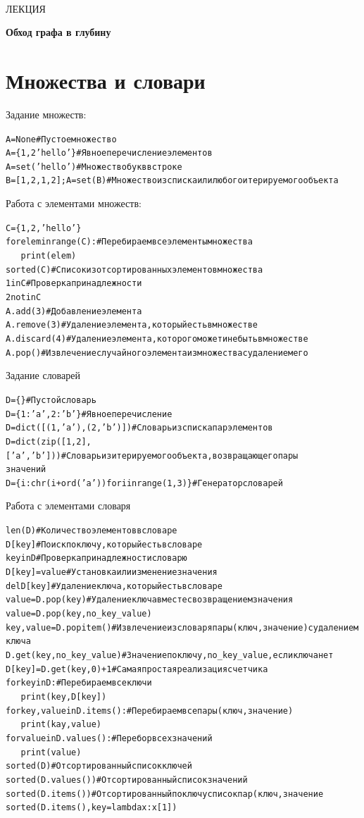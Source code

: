 \documentclass[a4paper,12pt]{article}
\theoremstyle{plain} %
\theoremstyle{definition} %
\theoremstyle{remark} %
\newcounter{infa}[section]
\newcounter{num}
\newcommand{\tab}{\ \ \ }
\newcommand{\com}[1]{{\color{grey}\# #1}}
\newcommand{\ini}{{\color{infa}in}}
\newcommand{\rangei}{{\color{infa}range}}
\newcommand{\fori}{{\color{infa}for}}
\newcommand{\printi}{{\color{infa1}print}}
\newcommand{\seti}{{\color{infa}set}}
\newcommand{\noti}{{\color{infa}not}}
\newcommand{\dicti}{{\color{infa}dict}}
\newcommand{\zipi}{{\color{infa}zip}}
\newcommand{\chri}{{\color{infa}chr}}
\newcommand{\ordi}{{\color{infa}ord}}
\newcommand{\leni}{{\color{infa}len}}
\newcommand{\deli}{{\color{infa}del}}
\newcommand{\sortedi}{{\color{infa}sorted}}
\newcommand{\keyi}{{\color{infa}key}}
\newcommand{\lambdai}{{\color{infa}lambda}}
\newenvironment{infanoname}{
	
	\begin{alltt}%
	}{\end{alltt}
	\setcounter{num}{0}
	\vspace{0.1cm}}
\begin{document}
\newcommand{\lec}[1]{\addtocounter{lec}{1} \setcounter{section}{0}%
\begin{center}
{\LARGE ЛЕКЦИЯ %
\vspace{2mm}%

\textbf{#1}%
}
\end{center}
}
\newpage
\
\setcounter{lec}{2}
\lec{Обход графа в глубину}
\section{Множества и словари}
\noindent Задание множеств:
\begin{infanoname}
A = None \com{Пустое множество}
A = \{1, 2 'hello'\} \com{Явное перечисление элементов}
A = \seti('hello') \com{Множество букв в строке}
B = [1, 2, 1, 2]; A = \seti(B) \com{Множество из списка или любого итерируемого объекта}
\end{infanoname}
Работа с элементами множеств:
\begin{infanoname}
C = \{1, 2, 'hello'\}
\fori elem \ini \rangei(C): \com{Перебираем все элементы множества}
\tab \printi(elem)
sorted(C) \com{Список из отсортированных элементов множества}
1 \ini C \com{Проверка принадлежности}
2 \noti \ini C
A.add(3) \com{Добавление элемента}
A.remove(3) \com{Удаление элемента, который есть в множестве}
A.discard(4) \com{Удаление элемента, которого может и не быть в множестве}
A.pop() \com{Извлечение случайного элемента из множества с удалением его}
\end{infanoname}
Задание словарей
\begin{infanoname}
D = \{\} \com{Пустой словарь}
D = \{1: 'a', 2: 'b'\} \com{Явное перечисление}
D = \dicti([(1, 'a'), (2, 'b')]) \com{Словарь из списка пар элементов}
D = \dicti(\zipi([1, 2], ['a', 'b'])) \com{Словарь из итерируемого объекта, возвращающего пары\\ значений}
D = \{i: \chri(i + \ordi('a')) \fori i \ini \rangei(1, 3)\} \com{Генератор словарей}
\end{infanoname}
Работа с элементами словаря
\begin{infanoname}
\leni(D) \com{Количество элементов в словаре}
D[key] \com{Поиск по ключу, который есть в словаре}
key in D \com{Проверка принадлежности словарю}
D[key] = value \com{Установка или изменение значения}
\deli D[key] \com{Удаление ключа, который есть в словаре}
value = D.pop(key) \com{Удаление ключа вместе с возвращением значения}
value = D.pop(key, no_key_value)
key, value = D.popitem() \com{Извлечение из словаря пары (ключ, значение) с удалением ключа}
D.get(key, no_key_value) \com{Значение по ключу, no_key_value, если ключа нет}
D[key] = D.get(key, 0) + 1 \com{Самая простая реализация счетчика}
\fori key \ini D: \com{Перебираем все ключи}
\tab \printi(key, D[key])
\fori key, value \ini D.items(): \com{Перебираем все пары (ключ, значение)}
\tab \printi(kay, value)
\fori value \ini D.values(): \com{Перебор всех значений}
\tab \printi(value)
\sortedi(D) \com{Отсортированный список ключей}
\sortedi(D.values()) \com{Отсортированный список значений}
\sortedi(D.items()) \com{Отсортированный по ключу список пар (ключ, значение}
\sortedi(D.items(), \keyi = \lambdai x: x[1])
\end{infanoname}
\end{document}
